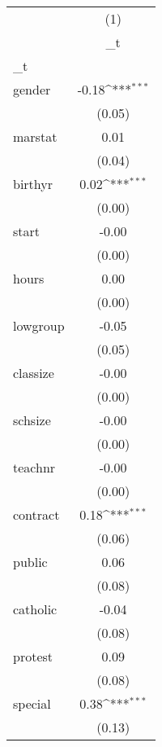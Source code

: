 \documentclass{article}
\begin{document}
{
\def\sym#1{\ifmmode^{#1}\else\(^{#1}\)\fi}
\begin{tabular}{l*{1}{c}}
\hline\hline
            &\multicolumn{1}{c}{(1)}\\
            &\multicolumn{1}{c}{\_t}\\
\hline
\_t          &                     \\
gender      &       -0.18\sym{***}\\
            &      (0.05)         \\
[1em]
marstat     &        0.01         \\
            &      (0.04)         \\
[1em]
birthyr     &        0.02\sym{***}\\
            &      (0.00)         \\
[1em]
start       &       -0.00         \\
            &      (0.00)         \\
[1em]
hours       &        0.00         \\
            &      (0.00)         \\
[1em]
lowgroup    &       -0.05         \\
            &      (0.05)         \\
[1em]
classize    &       -0.00         \\
            &      (0.00)         \\
[1em]
schsize     &       -0.00         \\
            &      (0.00)         \\
[1em]
teachnr     &       -0.00         \\
            &      (0.00)         \\
[1em]
contract    &        0.18\sym{***}\\
            &      (0.06)         \\
[1em]
public      &        0.06         \\
            &      (0.08)         \\
[1em]
catholic    &       -0.04         \\
            &      (0.08)         \\
[1em]
protest     &        0.09         \\
            &      (0.08)         \\
[1em]
special     &        0.38\sym{***}\\
            &      (0.13)         \\

\end{tabular}}
\end{document}
